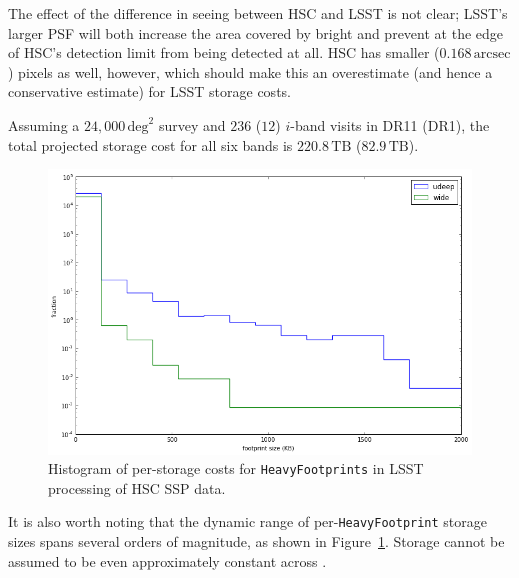 \documentclass[DM,toc]{lsstdoc}
\begin{document}
The effect of the difference in seeing between HSC and LSST is not clear; LSST's larger PSF will both increase the area covered by bright \Objects and prevent \Objects at the edge of HSC's detection limit from being detected at all.  HSC has smaller ($0.168\,\mathrm{arcsec}$) pixels as well, however, which should make this an overestimate (and hence a conservative estimate) for LSST storage costs.

Assuming a $24,000\,\mathrm{deg}^2$ survey and $236$ ($12$) $i$-band visits in DR11 (DR1), the total projected storage cost for all six bands is $220.8\,\mathrm{TB}$ ($82.9\,\mathrm{TB}$).

\begin{figure}
\includegraphics[width=\textwidth]{histogram.png}
\caption{Histogram of per-\Object storage costs for \texttt{HeavyFootprints} in LSST processing of HSC SSP data.}
\label{fig:histogram}
\end{figure}

It is also worth noting that the dynamic range of per-\Object \texttt{HeavyFootprint} storage sizes spans several orders of magnitude, as shown in Figure~\ref{fig:histogram}.  Storage cannot be assumed to be even approximately constant across \Objects.


\end{document}
